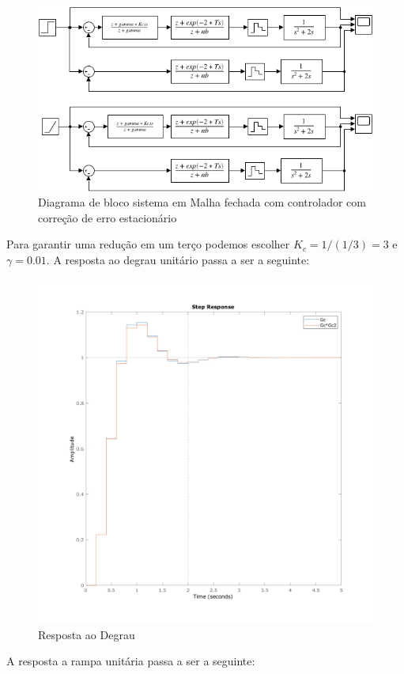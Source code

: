 \documentclass[a4paper,11pt]{article}
\begin{document}
\begin{figure}[H]
    \centering
    \includegraphics[width=0.8\linewidth]{img/exsim3modelPart2d.png}
    \caption{Diagrama de bloco sistema em Malha fechada com controlador com correção de erro estacionário}
\end{figure}

Para garantir uma redução em um terço podemos escolher $K_c = 1/(1/3) = 3$ e $\gamma = 0.01$. A resposta ao degrau unitário passa a ser a seguinte:

\begin{figure}[H]
    \centering
    \includegraphics[width=0.8\linewidth]{img/exsim3-step-g3-control.png}
    \caption{Resposta ao Degrau}
    \label{fig:ex3-step-g2-control}
\end{figure}

A resposta a rampa unitária passa a ser a seguinte:
\end{document}
